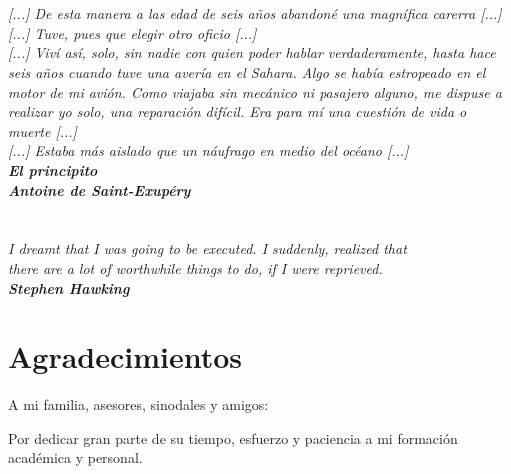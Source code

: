 \chapter*{}
\begin{flushright}
	\textit{[...] De esta manera a las edad de seis años abandoné una magnífica carerra [...]}\\
\vspace{1cm}
	\textit{ [...] Tuve, pues que elegir otro oficio [...]}\\
\vspace{1cm}
	\textit{[...] Viví así, solo, sin nadie con quien poder hablar verdaderamente, hasta hace seis años cuando tuve una avería en el Sahara. Algo se había estropeado en el motor de mi avión. Como viajaba sin mecánico ni pasajero alguno, me dispuse a realizar yo solo, una reparación difícil. Era para mí una cuestión de vida o muerte [...]}\\
\vspace{1cm}
	\textit{[...] Estaba más aislado que un náufrago en medio del océano [...]}\\
\vspace{1cm}
	\textbf{\textit{El principito}\\
	\textit{Antoine de Saint-Exupéry}}\\
\end{flushright}

\chapter*{}
\vspace{5cm}
\begin{flushright}
\textit{ I dreamt that I was going to be executed. I suddenly, realized that\\ there are a lot of worthwhile things to do, if I were reprieved.}\\
\textbf{\textit{Stephen Hawking}}\\
\end{flushright}


\chapter*{Agradecimientos}

A mi familia, asesores, sinodales y amigos:

Por dedicar gran parte de su tiempo, esfuerzo y paciencia a mi formación académica y personal.
